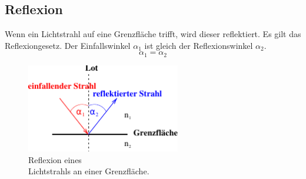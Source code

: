 \subsection{Reflexion}
\label{subsec:Reflexion}

\begin{minipage}[t]{0.5\textwidth}
    Wenn ein Lichtstrahl auf eine Grenzfläche trifft, wird  dieser reflektiert. 
    Es gilt das Reflexiongesetz.
    Der Einfallswinkel $\alpha_1$ ist gleich der Reflexionswinkel $\alpha_2$.
    \begin{equation}
        \alpha_1 = \alpha_2
        \label{eqn:Reflexion}
    \end{equation}
\end{minipage}
\begin{minipage}[t]{0.5\textwidth}
    \begin{figure}[H]
        \centering
        \includegraphics[width=0.6\textwidth]{build/Abb_2a.pdf}
        \caption {Reflexion eines \\Lichtstrahls an einer Grenzfläche\cite[2]{V400}.}
        \label{fig:Abb_1}
    \end{figure}
\end{minipage}

